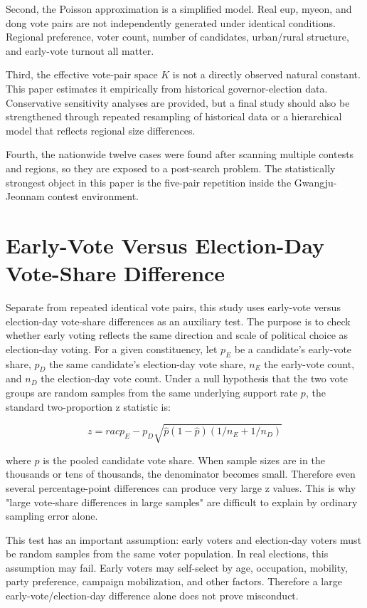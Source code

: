 \documentclass[preprint]{IEIE}
\begin{document}
Second, the Poisson approximation is a simplified model. Real eup, myeon, and dong vote pairs are not independently generated under identical conditions. Regional preference, voter count, number of candidates, urban/rural structure, and early-vote turnout all matter.

Third, the effective vote-pair space \(K\) is not a directly observed natural constant. This paper estimates it empirically from historical governor-election data. Conservative sensitivity analyses are provided, but a final study should also be strengthened through repeated resampling of historical data or a hierarchical model that reflects regional size differences.

Fourth, the nationwide twelve cases were found after scanning multiple contests and regions, so they are exposed to a post-search problem. The statistically strongest object in this paper is the five-pair repetition inside the Gwangju-Jeonnam contest environment.

\section{Early-Vote Versus Election-Day Vote-Share Difference}

Separate from repeated identical vote pairs, this study uses early-vote versus election-day vote-share differences as an auxiliary test. The purpose is to check whether early voting reflects the same direction and scale of political choice as election-day voting. For a given constituency, let \(p_E\) be a candidate's early-vote share, \(p_D\) the same candidate's election-day vote share, \(n_E\) the early-vote count, and \(n_D\) the election-day vote count. Under a null hypothesis that the two vote groups are random samples from the same underlying support rate \(p\), the standard two-proportion z statistic is:

\[
z =
rac{p_E - p_D}{\sqrt{\hat{p}(1-\hat{p})(1/n_E + 1/n_D)}}
\]

where \(\hat{p}\) is the pooled candidate vote share. When sample sizes are in the thousands or tens of thousands, the denominator becomes small. Therefore even several percentage-point differences can produce very large z values. This is why "large vote-share differences in large samples" are difficult to explain by ordinary sampling error alone.

This test has an important assumption: early voters and election-day voters must be random samples from the same voter population. In real elections, this assumption may fail. Early voters may self-select by age, occupation, mobility, party preference, campaign mobilization, and other factors. Therefore a large early-vote/election-day difference alone does not prove misconduct.
\end{document}
